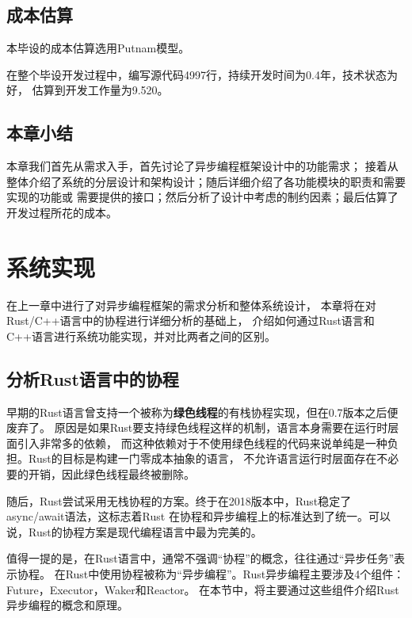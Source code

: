 \documentclass[supercite]{HustGraduPaper}
\theoremstyle{definition}
\begin{document}
\subsection{成本估算}

本毕设的成本估算选用Putnam模型。\par

在整个毕设开发过程中，编写源代码4997行，持续开发时间为0.4年，技术状态为好，
估算到开发工作量为9.520。\par

\subsection{本章小结}

本章我们首先从需求入手，首先讨论了异步编程框架设计中的功能需求；
接着从整体介绍了系统的分层设计和架构设计；随后详细介绍了各功能模块的职责和需要实现的功能或
需要提供的接口；然后分析了设计中考虑的制约因素；最后估算了开发过程所花的成本。\par

\section{系统实现}

在上一章中进行了对异步编程框架的需求分析和整体系统设计，
本章将在对Rust/C++语言中的协程进行详细分析的基础上，
介绍如何通过Rust语言和C++语言进行系统功能实现，并对比两者之间的区别。\par

\subsection{分析Rust语言中的协程}
早期的Rust语言曾支持一个被称为\textbf{绿色线程}的有栈协程实现，但在0.7版本之后便废弃了。
原因是如果Rust要支持绿色线程这样的机制，语言本身需要在运行时层面引入非常多的依赖，
而这种依赖对于不使用绿色线程的代码来说单纯是一种负担。Rust的目标是构建一门零成本抽象的语言，
不允许语言运行时层面存在不必要的开销，因此绿色线程最终被删除。\par

随后，Rust尝试采用无栈协程的方案。终于在2018版本中，Rust稳定了async/await语法，这标志着Rust
在协程和异步编程上的标准达到了统一。可以说，Rust的协程方案是现代编程语言中最为完美的。\par

值得一提的是，在Rust语言中，通常不强调“协程”的概念，往往通过“异步任务”表示协程。
在Rust中使用协程被称为“异步编程”。Rust异步编程主要涉及4个组件：Future，Executor，Waker和Reactor。
在本节中，将主要通过这些组件介绍Rust异步编程的概念和原理。\par
\end{document}
